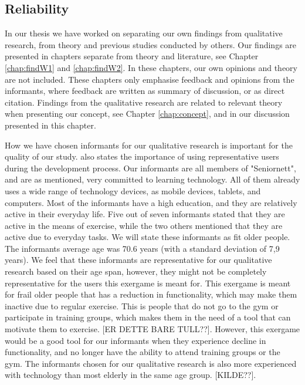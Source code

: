 \subsection{Reliability}
In our thesis we have worked on separating our own findings from qualitative research, from theory and previous studies conducted by others. Our findings are presented in chapters separate from theory and literature, see Chapter \ref{chap:findW1} and \ref{chap:findW2}. In these chapters, our own opinions and theory are not included. These chapters only emphasise feedback and opinions from the informants, where feedback are written as summary of discussion, or as direct citation. Findings from the qualitative research are related to relevant theory when presenting our concept, see Chapter \ref{chap:concept}, and in our discussion presented in this chapter.

How we have chosen informants for our qualitative research is important for the quality of our study. \cite{gregor} also states the importance of using representative users during the development process. Our informants are all members of "Seniornett", and are as mentioned, very committed to learning technology. All of them already uses a wide range of technology devices, as mobile devices, tablets, and computers. Most of the informants have a high education, and they are relatively active in their everyday life. Five out of seven informants stated that they are active in the means of exercise, while the two others mentioned that they are active due to everyday tasks. We will state these informants as fit older people. The informants average age was 70.6 years (with a standard deviation of 7,9 years). We feel that these informants are representative for our qualitative research based on their age span, however, they might not be completely representative for the users this exergame is meant for. This exergame is meant for frail older people that has a reduction in functionality, which may make them inactive due to regular exercise. This is people that do not go to the gym or participate in training groups, which makes them in the need of a tool that can motivate them to exercise. [ER DETTE BARE TULL??]. However, this exergame would be a good tool for our informants when they experience decline in functionality, and no longer have the ability to attend training groups or the gym. The informants chosen for our qualitative research is also more experienced with technology than most elderly in the same age group. [KILDE??].  

